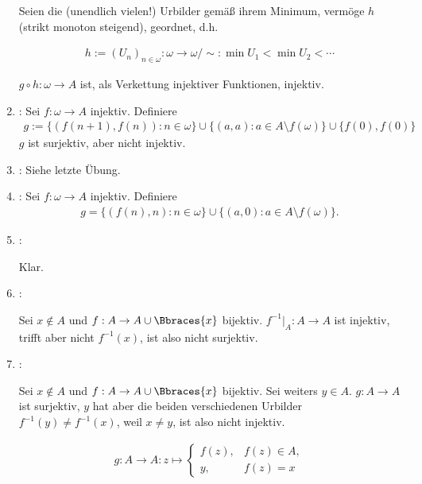 \begin{solution}
\begin{enumerate}[label = \texttt{ad}]
    \phantom{}

    Seien die (unendlich vielen!) Urbilder gemäß ihrem Minimum, vermöge $h$ (strikt monoton steigend), geordnet, d.h.

    \begin{align*}
      h := (U_n)_{n \in \omega}:
      \omega \to \omega / \sim:
      \min U_1 < \min U_2 < \cdots
    \end{align*}

    $g \circ h: \omega \to A$ ist, als Verkettung injektiver Funktionen, injektiv.

    \item {}: Sei $f: \omega \to A$ injektiv. Definiere
  \begin{align*}
    g := \{(f(n+1),f(n)): n \in \omega\} \cup \{(a,a): a \in A \setminus f(\omega)\}
    \cup \{f(0),f(0)\}
  \end{align*}
  $g$ ist surjektiv, aber nicht injektiv.

  \item {}: Siehe letzte Übung.

  \item {}: Sei $f: \omega \to A$ injektiv. Definiere
  \begin{align*}
    g = \{(f(n), n): n \in \omega\} \cup \{(a,0): a \in A \setminus f(\omega)\}.
  \end{align*}

  \item {}:

  Klar.

  \item {}:

  Sei $x \not \in A$ und $f: A \to A \cup \Bbraces{x}$ bijektiv.
  $f^{-1} |_A: A \to A$ ist injektiv, trifft aber nicht $f^{-1}(x)$, ist also nicht surjektiv.

  \item {}:

  Sei $x \not \in A$ und $f: A \to A \cup \Bbraces{x}$ bijektiv.
  Sei weiters $y \in A$.
  $g: A \to A$ ist surjektiv, $y$ hat aber die beiden verschiedenen Urbilder $f^{-1}(y) \neq f^{-1}(x)$, weil $x \neq y$, ist also nicht injektiv.

  \begin{align*}
    g:
    A \to A:
    z
    \mapsto
    \begin{cases}
      f(z), & f(z) \in A, \\
      y,    & f(z) = x
    \end{cases}
  \end{align*}


\end{enumerate}
\end{solution}
